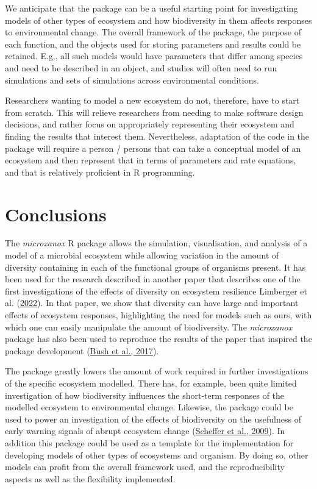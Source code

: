 \documentclass[
]{article}
\begin{document}
We anticipate that the package can be a useful starting point for
investigating models of other types of ecosystem and how biodiversity in
them affects responses to environmental change. The overall framework of
the package, the purpose of each function, and the objects used for
storing parameters and results could be retained. E.g., all such models
would have parameters that differ among species and need to be described
in an object, and studies will often need to run simulations and sets of
simulations across environmental conditions.

Researchers wanting to model a new ecosystem do not, therefore, have to
start from scratch. This will relieve researchers from needing to make
software design decisions, and rather focus on appropriately
representing their ecosystem and finding the results that interest them.
Nevertheless, adaptation of the code in the package will require a
person / persons that can take a conceptual model of an ecosystem and
then represent that in terms of parameters and rate equations, and that
is relatively proficient in R programming.

\hypertarget{conclusions}{%
\section{Conclusions}\label{conclusions}}

The \emph{microxanox} R package allows the simulation, visualisation,
and analysis of a model of a microbial ecosystem while allowing
variation in the amount of diversity containing in each of the
functional groups of organisms present. It has been used for the
research described in another paper that describes one of the first
investigations of the effects of diversity on ecosystem resilience
Limberger et al. (\protect\hyperlink{ref-Limberger2022}{2022}). In that
paper, we show that diversity can have large and important effects of
ecosystem responses, highlighting the need for models such as ours, with
which one can easily manipulate the amount of biodiversity. The
\emph{microxanox} package has also been used to reproduce the results of
the paper that inspired the package development
(\protect\hyperlink{ref-Bush2017}{Bush et al., 2017}).

The package greatly lowers the amount of work required in further
investigations of the specific ecosystem modelled. There has, for
example, been quite limited investigation of how biodiversity influences
the short-term responses of the modelled ecosystem to environmental
change. Likewise, the package could be used to power an investigation of
the effects of biodiversity on the usefulness of early warning signals
of abrupt ecosystem change
(\protect\hyperlink{ref-Scheffer2009}{Scheffer et al., 2009}). In
addition this package could be used as a template for the implementation
for developing models of other types of ecosystems and organism. By
doing so, other models can profit from the overall framework used, and
the reproducibility aspects as well as the flexibility implemented.
\end{document}
